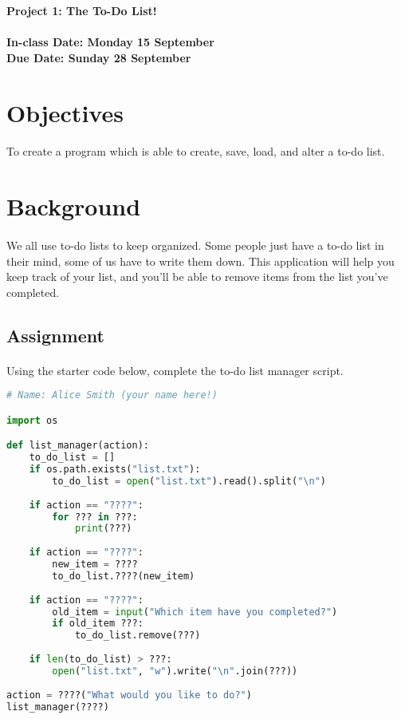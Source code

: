 \documentclass[letter,10pt]{article}
\begin{document}
    
    \huge
    \textbf{Project 1: The To-Do List!}
    \normalsize
    \\ ~~ \\
    \textbf{In-class Date: Monday 15 September} \\
    \textbf{Due Date: Sunday 28 September}
    
    \section*{Objectives}
    \paragraph{}To create a program which is able to create, save, load, and alter a to-do list.
    
    \section*{Background}
    \paragraph{}We all use to-do lists to keep organized. Some people just have a to-do list in their mind, some of us have to write them down. This application will help you keep track of your list, and you'll be able to remove items from the list you've completed.
    
    \subsection*{Assignment}
    \paragraph{}Using the starter code below, complete the to-do list manager script.
    
    \begin{lstlisting}[language=python]
# Name: Alice Smith (your name here!)

import os

def list_manager(action):
    to_do_list = []
    if os.path.exists("list.txt"):
        to_do_list = open("list.txt").read().split("\n")
    
    if action == "????":
        for ??? in ???:
            print(???)
    
    if action == "????":
        new_item = ????
        to_do_list.????(new_item)
    
    if action == "????":
        old_item = input("Which item have you completed?")
        if old_item ???:
            to_do_list.remove(???)
    
    if len(to_do_list) > ???:
        open("list.txt", "w").write("\n".join(???))
    
action = ????("What would you like to do?")
list_manager(????)
    \end{lstlisting}
    
\end{document}
